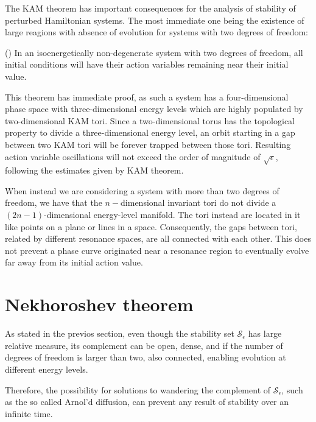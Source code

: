The KAM theorem has important consequences for the analysis of stability of perturbed Hamiltonian systems. The most immediate one being the existence of large reagions with absence of evolution for systems with two degrees of freedom:
\begin{theorem}(\cite{KAM1})
    In an isoenergetically non-degenerate system with two degrees of freedom, all initial conditions will have their action variables remaining near their initial value.
\end{theorem} 
This theorem has immediate proof, as such a system has a four-dimensional phase space with three-dimensional energy levels which are highly populated by two-dimensional KAM tori. Since a two-dimensional torus has the topological property to divide a three-dimensional energy level, an orbit starting in a gap between two KAM tori will be forever trapped between those tori. Resulting action variable oscillations will not exceed the order of magnitude of $\sqrt{\epsilon}$, following the estimates given by KAM theorem. 

When instead we are considering a system with more than two degrees of freedom, we have that the $n-$dimensional invariant tori do not divide a $(2n-1)$-dimensional energy-level manifold. The tori instead are located in it like points on a plane or lines in a space. Consequently, the gaps between tori, related by different resonance spaces, are all connected with each other. This does not prevent a phase curve originated near a resonance region to eventually evolve far away from its initial action value. 

\section{Nekhoroshev theorem}\label{sec:1:nekhoroshev}

As stated in the previos section, even though the stability set $\mathcal{S}_\epsilon$ has large relative measure, its complement can be open, dense, and if the number of degrees of freedom is larger than two, also connected, enabling evolution at different energy levels.

Therefore, the possibility for solutions to wandering the complement of $\mathcal{S}_\epsilon$, such as the so called Arnol’d diffusion, can prevent any result of stability over an infinite time.

